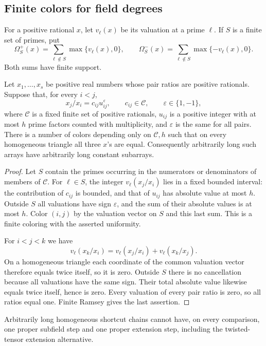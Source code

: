 \subsection{Finite colors for field degrees}

For a positive rational $x$, let $v_\ell(x)$ be its valuation at a prime
$\ell$.  If $S$ is a finite set of primes, put
\[
 \Omega_S^+(x)=\sum_{\ell\notin S}\max\{v_\ell(x),0\},
 \qquad
 \Omega_S^-(x)=\sum_{\ell\notin S}\max\{-v_\ell(x),0\}.
\]
Both sums have finite support.

\begin{lemma}\label{grw:prime-colors}
Let $x_1,\ldots,x_s$ be positive real numbers whose pair ratios are
positive rationals.  Suppose that, for every $i<j$,
\[
 x_j/x_i=c_{ij}u_{ij}^{\varepsilon},\qquad
 c_{ij}\in\mathcal C,\qquad \varepsilon\in\{1,-1\},
\]
where $\mathcal C$ is a fixed finite set of positive rationals,
$u_{ij}$ is a positive integer with at most $h$ prime factors counted
with multiplicity, and $\varepsilon$ is the same for all pairs.
There is a number of colors depending only on $\mathcal C,h$ such that
on every homogeneous triangle all three $x$'s are equal.
Consequently arbitrarily long such arrays have arbitrarily long
constant subarrays.
\end{lemma}

\begin{proof}
Let $S$ contain the primes occurring in the numerators or denominators
of members of $\mathcal C$.  For $\ell\in S$, the integer
$v_\ell(x_j/x_i)$ lies in a fixed bounded interval: the contribution of
$c_{ij}$ is bounded, and that of $u_{ij}$ has absolute value at most $h$.
Outside $S$ all valuations have sign $\varepsilon$, and the sum of their
absolute values is at most $h$.  Color $(i,j)$ by the valuation vector
on $S$ and this last sum.  This is a finite coloring with the asserted
uniformity.

For $i<j<k$ we have
\[
 v_\ell(x_k/x_i)=v_\ell(x_j/x_i)+v_\ell(x_k/x_j).
\]
On a homogeneous triangle each coordinate of the common valuation
vector therefore equals twice itself, so it is zero.  Outside $S$
there is no cancellation because all valuations have the same sign.
Their total absolute value likewise equals twice itself, hence is zero.
Every valuation of every pair ratio is zero, so all ratios equal one.
Finite Ramsey gives the last assertion.
\end{proof}

\begin{lemma}\label{grw:opposite-fields}
Arbitrarily long homogeneous shortcut chains cannot have, on every
comparison, one proper subfield step and one proper extension step,
including the twisted-tensor extension alternative.
\end{lemma}

